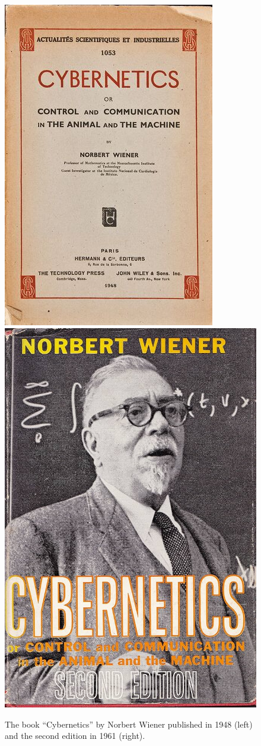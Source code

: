 \documentclass[../../book-main.tex]{subfiles}
\begin{document}
\begin{figure}
    \centering
    \includegraphics[height=0.4\linewidth]{figures/Cybernetics1.jpg}
    \hspace{10mm} \includegraphics[height=0.4\linewidth]{figures/Cybernetics2.jpg}
    \caption{The book ``Cybernetics'' by Norbert Wiener published in 1948 \cite{Wiener-Cybernetics-1948} (left) and the second edition in 1961 \cite{Wiener-Cybernetics-1961} (right).}
    \label{fig:cybernetcis}
\end{figure}
\end{document}
